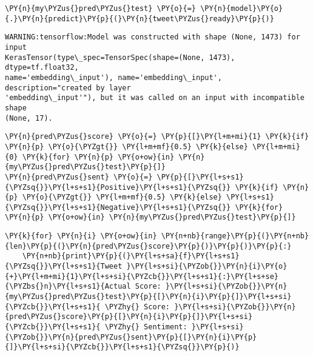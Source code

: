     \begin{tcolorbox}[breakable, size=fbox, boxrule=1pt, pad at break*=1mm,colback=cellbackground, colframe=cellborder]
\begin{Verbatim}[commandchars=\\\{\}]
\PY{n}{my\PYZus{}pred\PYZus{}test} \PY{o}{=} \PY{n}{model}\PY{o}{.}\PY{n}{predict}\PY{p}{(}\PY{n}{tweet\PYZus{}ready}\PY{p}{)}
\end{Verbatim}
\end{tcolorbox}

    \begin{Verbatim}[commandchars=\\\{\}]
WARNING:tensorflow:Model was constructed with shape (None, 1473) for input
KerasTensor(type\_spec=TensorSpec(shape=(None, 1473), dtype=tf.float32,
name='embedding\_input'), name='embedding\_input', description="created by layer
'embedding\_input'"), but it was called on an input with incompatible shape
(None, 17).
    \end{Verbatim}

    \begin{tcolorbox}[breakable, size=fbox, boxrule=1pt, pad at break*=1mm,colback=cellbackground, colframe=cellborder]
\begin{Verbatim}[commandchars=\\\{\}]
\PY{n}{pred\PYZus{}score} \PY{o}{=} \PY{p}{[}\PY{l+m+mi}{1} \PY{k}{if} \PY{n}{p} \PY{o}{\PYZgt{}} \PY{l+m+mf}{0.5} \PY{k}{else} \PY{l+m+mi}{0} \PY{k}{for} \PY{n}{p} \PY{o+ow}{in} \PY{n}{my\PYZus{}pred\PYZus{}test}\PY{p}{]}
\PY{n}{pred\PYZus{}sent} \PY{o}{=} \PY{p}{[}\PY{l+s+s1}{\PYZsq{}}\PY{l+s+s1}{Positive}\PY{l+s+s1}{\PYZsq{}} \PY{k}{if} \PY{n}{p} \PY{o}{\PYZgt{}} \PY{l+m+mf}{0.5} \PY{k}{else} \PY{l+s+s1}{\PYZsq{}}\PY{l+s+s1}{Negative}\PY{l+s+s1}{\PYZsq{}} \PY{k}{for} \PY{n}{p} \PY{o+ow}{in} \PY{n}{my\PYZus{}pred\PYZus{}test}\PY{p}{]}
\end{Verbatim}
\end{tcolorbox}

    \begin{tcolorbox}[breakable, size=fbox, boxrule=1pt, pad at break*=1mm,colback=cellbackground, colframe=cellborder]
\begin{Verbatim}[commandchars=\\\{\}]
\PY{k}{for} \PY{n}{i} \PY{o+ow}{in} \PY{n+nb}{range}\PY{p}{(}\PY{n+nb}{len}\PY{p}{(}\PY{n}{pred\PYZus{}score}\PY{p}{)}\PY{p}{)}\PY{p}{:}
    \PY{n+nb}{print}\PY{p}{(}\PY{l+s+sa}{f}\PY{l+s+s1}{\PYZsq{}}\PY{l+s+s1}{Tweet }\PY{l+s+si}{\PYZob{}}\PY{n}{i}\PY{o}{+}\PY{l+m+mi}{1}\PY{l+s+si}{\PYZcb{}}\PY{l+s+s1}{:}\PY{l+s+se}{\PYZbs{}n}\PY{l+s+s1}{Actual Score: }\PY{l+s+si}{\PYZob{}}\PY{n}{my\PYZus{}pred\PYZus{}test}\PY{p}{[}\PY{n}{i}\PY{p}{]}\PY{l+s+si}{\PYZcb{}}\PY{l+s+s1}{ \PYZhy{} Score: }\PY{l+s+si}{\PYZob{}}\PY{n}{pred\PYZus{}score}\PY{p}{[}\PY{n}{i}\PY{p}{]}\PY{l+s+si}{\PYZcb{}}\PY{l+s+s1}{ \PYZhy{} Sentiment: }\PY{l+s+si}{\PYZob{}}\PY{n}{pred\PYZus{}sent}\PY{p}{[}\PY{n}{i}\PY{p}{]}\PY{l+s+si}{\PYZcb{}}\PY{l+s+s1}{\PYZsq{}}\PY{p}{)}
\end{Verbatim}
\end{tcolorbox}


